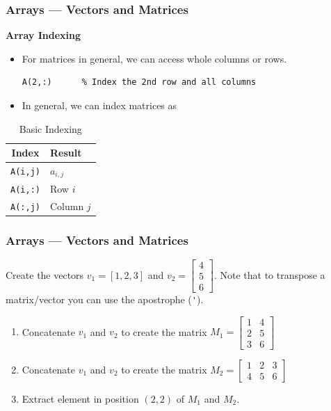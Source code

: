 \documentclass[11pt,xcolor={svgnames},aspectratio=169,usepdftitle=false,notheorems]{beamer}
\begin{document}
\begin{frame}[fragile]
    \frametitle{Arrays --- Vectors and Matrices}
\alert{\textbf{Array Indexing}}
    \begin{itemize}
        \item For matrices in general, we can access whole columns or rows.
\begin{lstlisting}
A(2,:)      % Index the 2nd row and all columns
\end{lstlisting}
        \item In general, we can index matrices as
    \end{itemize}
    \begin{table}[htbp]
        \caption{Basic Indexing}
        \label{tab:basic_indexing}
        \begin{tabular}{@{}cl@{}}
        \toprule
        Index & Result \\ \midrule
        \verb+A(i,j)+  & $a_{i,j}$ \\ 
        \verb+A(i,:)+  & Row $i$ \\ 
        \verb+A(:,j)+  & Column $j$ \\ \bottomrule
        \end{tabular}
    \end{table}
\end{frame}

\begin{frame}[fragile]
  \frametitle{Arrays --- Vectors and Matrices}
 \begin{exercise}
   Create the vectors $v_1 = [1, 2, 3]$ and $v_2 = \begin{bmatrix}
   4 \\
   5 \\ 
   6
   \end{bmatrix}$. Note that to transpose a matrix/vector you can use the apostrophe (\verb;';).
   \begin{enumerate}
    \item Concatenate $v_1$ and $v_2$ to create the matrix $M_1 = \begin{bmatrix}
        1 & 4 \\
        2 & 5 \\
        3 & 6 
    \end{bmatrix}$
    \item Concatenate $v_1$ and $v_2$ to create the matrix $M_2 = \begin{bmatrix}
        1 & 2 & 3 \\
        4 & 5 & 6 
    \end{bmatrix}$
    \item Extract element in position $(2,2)$ of $M_1$ and $M_2$.
   \end{enumerate} 
 \end{exercise}
  
\end{frame}
\end{document}

